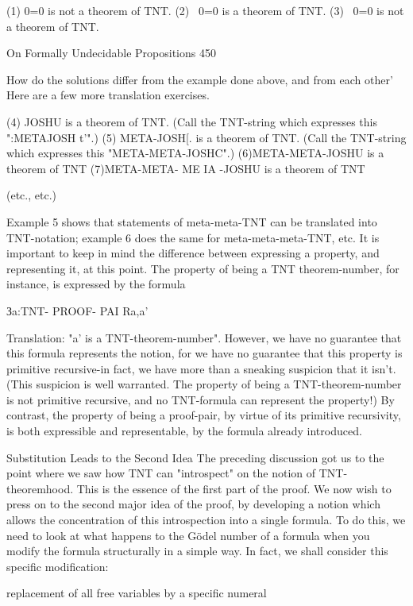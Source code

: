    (1) 0=0 is not a theorem of TNT.
   (2) ~0=0 is a theorem of TNT.
   (3) ~0=0 is not a theorem of TNT.




On Formally Undecidable Propositions                                                   450

How do the solutions differ from the example done above, and from each other' Here are
a few more translation exercises.


(4) JOSHU is a theorem of TNT. (Call the TNT-string which expresses this
   ":METAJOSH t'".)
   (5) META-JOSH[. is a theorem of TNT. (Call the TNT-string which expresses this
   "META-META-JOSHC".)
   (6)META-META-JOSHU is a theorem of TNT
   (7)META-META- ME IA -JOSHU is a theorem of TNT

   (etc., etc.)

Example 5 shows that statements of meta-meta-TNT can be translated into TNT-notation;
example 6 does the same for meta-meta-meta-TNT, etc.
        It is important to keep in mind the difference between expressing a property, and
representing it, at this point. The property of being a TNT theorem-number, for instance,
is expressed by the formula

                             Зa:TNT- PROOF- PAI R{a,a' }

Translation: "a' is a TNT-theorem-number". However, we have no guarantee that this
formula represents the notion, for we have no guarantee that this property is primitive
recursive-in fact, we have more than a sneaking suspicion that it isn't. (This suspicion is
well warranted. The property of being a TNT-theorem-number is not primitive recursive,
and no TNT-formula can represent the property!) By contrast, the property of being a
proof-pair, by virtue of its primitive recursivity, is both expressible and representable, by
the formula already introduced.

                      Substitution Leads to the Second Idea
The preceding discussion got us to the point where we saw how TNT can "introspect" on
the notion of TNT-theoremhood. This is the essence of the first part of the proof. We
now wish to press on to the second major idea of the proof, by developing a notion which
allows the concentration of this introspection into a single formula. To do this, we need to
look at what happens to the Gödel number of a formula when you modify the formula
structurally in a simple way. In fact, we shall consider this specific modification:

                  replacement of all free variables by a specific numeral

